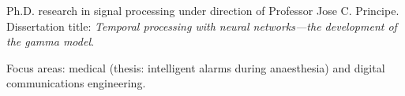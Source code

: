 
  Ph.D. research in signal
processing under direction of Professor Jose C. Principe.
Dissertation title: {\it Temporal processing with neural
networks---the development of the gamma model}.


  Focus areas: medical (thesis: intelligent alarms during anaesthesia) and
digital communications engineering.
